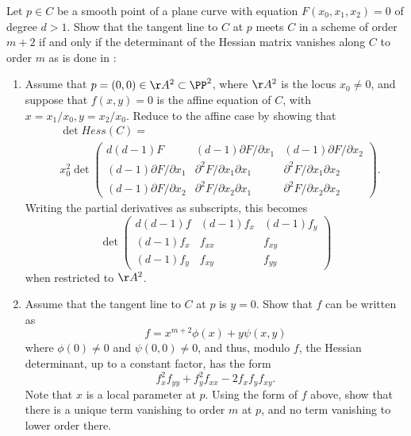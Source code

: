 \begin{exercise}\label{Hessian exercise} 
Let $p\in C$ be a smooth point of a  plane curve with equation $F(x_0,x_1,x_2) = 0$ of degree $d>1$. Show that the tangent line to $C$ at $p$ meets
$C$ in a scheme of order $m+2$ if and only if the determinant of the Hessian matrix vanishes
along $C$ to order $m$ as is done in \cite[pp. 84--85]{Kunz}:

\begin{enumerate}
\item Assume that $p = (0,0)\in \AA^2\subset \PP^2$, where $\AA^2$ is the locus $x_0\neq 0$, 
and suppose that $f(x,y) =0$ is the affine equation of $C$, with $x= x_1/x_0, y = x_2/x_0$.
Reduce to the affine case by showing that
$$
\begin{aligned}
&\det Hess(C) = \\
&x_0^2 \det 
\begin{pmatrix}
 d(d-1)F & (d-1) \partial F/\partial x_1 & (d-1) \partial F/\partial x_2 \\
 (d-1) \partial F/\partial x_1&\partial^2 F/\partial x_1 \partial x_1 & \partial^2 F/\partial x_1 \partial x_2\\
 (d-1) \partial F/\partial x_2 &\partial^2 F/\partial x_2 \partial x_1 & \partial^2 F/\partial x_2 \partial x_2 
\end{pmatrix} .
\end{aligned}
$$ 
Writing the partial derivatives as subscripts, this becomes
$$
\det \begin{pmatrix}
 d(d-1)f & (d-1) f_x & (d-1) f_y \\
 (d-1) f_x&f_{xx} & f_{xy}\\
 (d-1) f_y &f_{xy} & f_{yy}
\end{pmatrix}
$$ 
when restricted to $\AA^2$.

\item Assume that the tangent line to $C$ at $p$ is $y=0$. Show that $f$ can be written as
$$
f = x^{m+2}\phi(x) +y\psi(x,y)
$$
where $\phi(0) \neq 0$ and $\psi(0,0) \neq 0$, and thus, modulo $f$, the Hessian determinant,
up to a constant factor, 
has the form
$$
f_x^2f_{yy}+f_y^2f_{xx}-2f_xf_yf_{xy}.
$$
Note that $x$ is a local parameter at $p$. Using the form of $f$ above, show that there is a unique term vanishing to order $m$ at $p$,
and no term vanishing to lower order there.
\end{enumerate}
\end{exercise}

